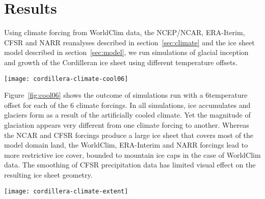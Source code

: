 
\section{Results}
\label{sec:results}

Using climate forcing from WorldClim data, the NCEP/NCAR, ERA-Iterim, CFSR and NARR reanalyses described in section~\ref{sec:climate} and the ice sheet model described in section~\ref{sec:model}, we run simulations of glacial inception and growth of the Cordilleran ice sheet using different temperature offsets.

\begin{figure*}[t]
	\vspace*{2mm}
	\begin{center}
		\texttt{[image: cordillera-climate-cool06]}
	\end{center}
	\caption{Ice surface topography (black contours every 1000\,m) and velocity (\unit{m\,yr^{-1}}) after 10\,kyr under a climate 6\degC colder than present for each climate forcing.}
	\label{fig:cool06}
\end{figure*}

Figure~\ref{fig:cool06} shows the outcome of simulations run with a 6\degC temperature offset for each of the 6 climate forcings. In all simulations, ice accumulates and glaciers form as a result of the artificially cooled climate. Yet the magnitude of glaciation appears very different from one climate forcing to another. Whereas the NCAR and CFSR forcings produce a large ice sheet that covers most of the model domain land, the WorldClim, ERA-Interim and NARR forcings lead to more restrictive ice cover, bounded to mountain ice caps in the case of WorldClim data. The smoothing of CFSR precipitation data has limited visual effect on the resulting ice sheet geometry.

\begin{figure*}[t]
	\vspace*{2mm}
	\begin{center}
		\texttt{[image: cordillera-climate-extent]}
	\end{center}
	\caption{Extent of ice cover after 10\,kyr as a function of applied temperature offsets for each climate forcing.}
	\label{fig:extent}
\end{figure*}

